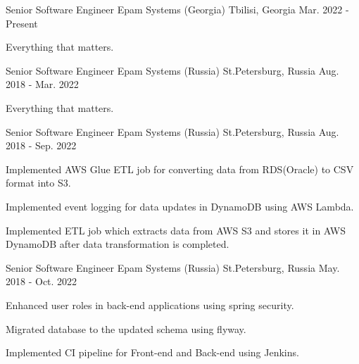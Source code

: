 

\begin{cventries}

  \cventry
    {Senior Software Engineer} %
    {Epam Systems (Georgia)} %
    {Tbilisi, Georgia} %
    {Mar. 2022 - Present} %
    {
      \begin{cvitems} %
        \item {Everything that matters.}
      \end{cvitems}
    }

\cventry
{Senior Software Engineer} %
{Epam Systems (Russia)} %
{St.Petersburg, Russia} %
{Aug. 2018 - Mar. 2022} %
{
  \begin{cvitems} %
    \item {Everything that matters.}
  \end{cvitems}
}

\cventry
{Senior Software Engineer} %
{Epam Systems (Russia)} %
{St.Petersburg, Russia} %
{Aug. 2018 - Sep. 2022} %
{
  \begin{cvitems} %
    \item {Implemented AWS Glue ETL job for converting data from RDS(Oracle) to CSV format into S3.}
    \item {Implemented event logging for data updates in DynamoDB using AWS Lambda.}
    \item {Implemented ETL job which extracts data from AWS S3 and stores it in AWS DynamoDB after data transformation is completed.}
  \end{cvitems}
}

\cventry
{Senior Software Engineer} %
{Epam Systems (Russia)} %
{St.Petersburg, Russia} %
{May. 2018 - Oct. 2022} %
{
  \begin{cvitems} %
    \item {Enhanced user roles in back-end applications using spring security.}
    \item {Migrated database to the updated schema using flyway.}
    \item {Implemented CI pipeline for  Front-end and Back-end using Jenkins.}
  \end{cvitems}
}

\end{cventries}
